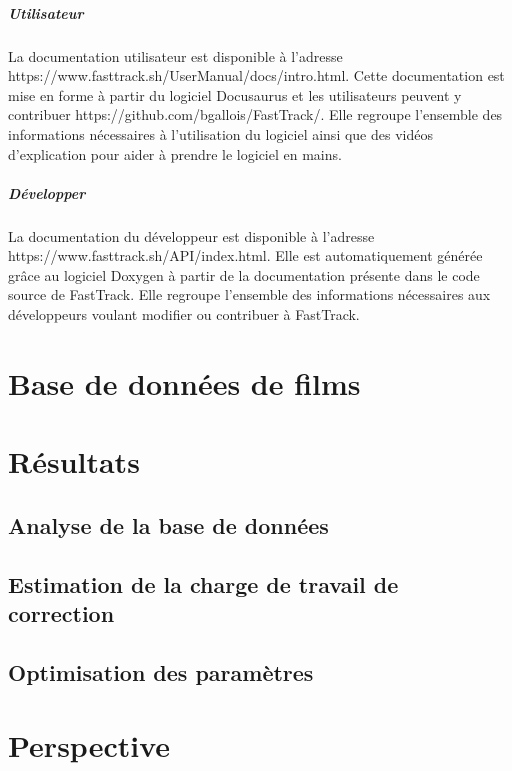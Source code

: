 		\paragraph{Utilisateur} La documentation utilisateur est disponible à l'adresse https://www.fasttrack.sh/UserManual/docs/intro.html. Cette documentation est mise en forme à partir du logiciel Docusaurus et les utilisateurs peuvent y contribuer https://github.com/bgallois/FastTrack/. Elle regroupe l'ensemble des informations nécessaires à l'utilisation du logiciel ainsi que des vidéos d'explication pour aider à prendre le logiciel en mains.
		
		\paragraph{Développer} La documentation du développeur est disponible à l'adresse https://www.fasttrack.sh/API/index.html. Elle est automatiquement générée grâce au logiciel Doxygen à partir de la documentation présente dans le code source de FastTrack. Elle regroupe l'ensemble des informations nécessaires aux développeurs voulant modifier ou contribuer à FastTrack.

		
\chapter{Base de données de films}


\chapter{Résultats}

	\section{Analyse de la base de données}
	
	\section{Estimation de la charge de travail de correction}
	
	\section{Optimisation des paramètres}
	
	
\chapter{Perspective}
